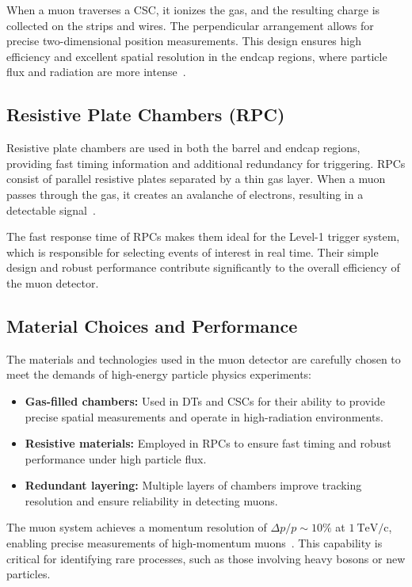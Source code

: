 When a muon traverses a CSC, it ionizes the gas, and the resulting charge is collected on the strips and wires. The perpendicular arrangement allows for precise two-dimensional position measurements. This design ensures high efficiency and excellent spatial resolution in the endcap regions, where particle flux and radiation are more intense~\cite{muon_tdr}.

\subsection{Resistive Plate Chambers (RPC)}
Resistive plate chambers are used in both the barrel and endcap regions, providing fast timing information and additional redundancy for triggering. RPCs consist of parallel resistive plates separated by a thin gas layer. When a muon passes through the gas, it creates an avalanche of electrons, resulting in a detectable signal~\cite{muon_tdr}.

The fast response time of RPCs makes them ideal for the Level-1 trigger system, which is responsible for selecting events of interest in real time. Their simple design and robust performance contribute significantly to the overall efficiency of the muon detector.

\subsection{Material Choices and Performance}
The materials and technologies used in the muon detector are carefully chosen to meet the demands of high-energy particle physics experiments:
\begin{itemize}
    \item \textbf{Gas-filled chambers:} Used in DTs and CSCs for their ability to provide precise spatial measurements and operate in high-radiation environments.
    \item \textbf{Resistive materials:} Employed in RPCs to ensure fast timing and robust performance under high particle flux.
    \item \textbf{Redundant layering:} Multiple layers of chambers improve tracking resolution and ensure reliability in detecting muons.
\end{itemize}

The muon system achieves a momentum resolution of $\Delta p / p \sim 10\%$ at $1~\mathrm{TeV/c}$, enabling precise measurements of high-momentum muons~\cite{muon_tdr}. This capability is critical for identifying rare processes, such as those involving heavy bosons or new particles.

